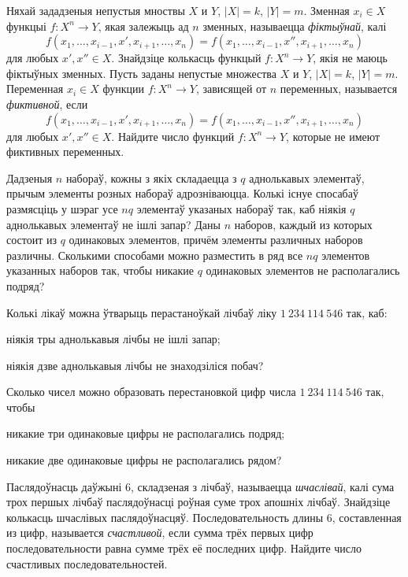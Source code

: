 \begin{problemList}
\problemItemSimple
{Няхай зададзеныя непустыя мноствы $X$ и $Y$, $|X| = k$, $|Y| = m$.
Зменная $x_i \in X$ функцыі $f\colon X^n \to Y$, якая залежыць ад $n$ зменных,
называецца \emph{фіктыўнай}, калі $$f(x_1, \ldots, x_{i - 1}, x', x_{i + 1}, \ldots, x_n) =
f(x_1, \ldots, x_{i - 1}, x'', x_{i + 1}, \ldots, x_n)$$ для любых $x', x'' \in X$.
Знайдзіце колькасць функцый $f\colon X^n \to Y$, якія не маюць фіктыўных зменных.}
{Пусть заданы непустые множества $X$ и $Y$, $|X| = k$, $|Y| = m$.
Переменная $x_i \in X$ функции $f\colon X^n \to Y$, зависящей от $n$ переменных,
называется \emph{фиктивной}, если $$f(x_1, \ldots, x_{i - 1}, x', x_{i + 1}, \ldots, x_n) =
f(x_1, \ldots, x_{i - 1}, x'', x_{i + 1}, \ldots, x_n)$$ для любых $x', x'' \in X$.
Найдите число функций $f\colon X^n \to Y$, которые не имеют фиктивных переменных.}

\bigskip

\problemItemSimple
{Дадзеныя $n$ набораў, кожны з якіх складаецца з $q$ аднолькавых элементаў, прычым
элементы розных набораў адрозніваюцца. Колькі існуе спосабаў размясціць у шэраг
усе $nq$ элементаў указаных набораў так, каб ніякія $q$ аднолькавых элементаў
не ішлі запар?}
{Даны $n$ наборов, каждый из которых состоит из $q$ одинаковых элементов, причём
элементы различных наборов различны. Сколькими способами можно разместить в ряд
все $nq$ элементов указанных наборов так, чтобы никакие $q$ одинаковых элементов
не располагались подряд?}

\bigskip

\problemItemSimple
{Колькі лікаў можна ўтварыць перастаноўкай лічбаў ліку $1~234~114~546$ так, каб:
\begin{belarusianEnumerate}
  \item ніякія тры аднолькавыя лічбы не ішлі запар;
  \item ніякія дзве аднолькавыя лічбы не знаходзіліся побач?
\end{belarusianEnumerate}
}
{Сколько чисел можно образовать перестановкой цифр числа $1~234~114~546$ так,
чтобы
\begin{russianEnumerate}
  \item никакие три одинаковые цифры не располагались подряд;
  \item никакие две одинаковые цифры не располагались рядом?
\end{russianEnumerate}}

\bigskip

\problemItemSimple
{Паслядоўнасць даўжыні 6, складзеная з лічбаў, называецца \emph{шчаслівай},
калі сума трох першых лічбаў паслядоўнасці роўная суме трох апошніх лічбаў.
Знайдзіце колькасць шчаслівых паслядоўнасцяў.}
{Последовательность длины 6, составленная из цифр, называется \emph{счастливой},
если сумма трёх первых цифр последовательности равна сумме трёх её последних цифр.
Найдите число счастливых последовательностей.}


\end{problemList}
